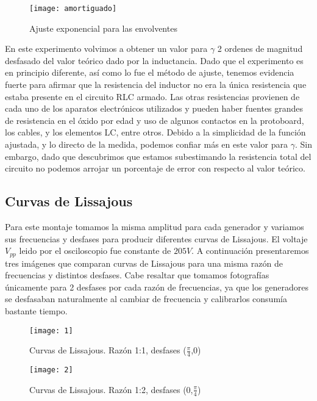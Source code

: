 \documentclass[%
 reprint,
 amsmath,amssymb,
 aps,
]{revtex4-1}
\begin{document}
\begin{figure}[h]
\caption{Ajuste exponencial para las envolventes}
\centering
\texttt{[image: amortiguado]}
\label{fig:amortiguado}
\end{figure}

En este experimento volvimos a obtener un valor para $\gamma$ 2 ordenes de magnitud desfasado del valor te\'orico dado por la inductancia. Dado que el experimento es en principio diferente, as\'i como lo fue el m\'etodo de ajuste, tenemos evidencia fuerte para afirmar que la resistencia del inductor no era la \'unica resistencia que estaba presente en el circuito RLC armado. Las otras resistencias provienen de cada uno de los aparatos electr\'onicos utilizados y pueden haber fuentes grandes de resistencia en el \'oxido por edad y uso de algunos contactos en la protoboard, los cables, y los elementos LC, entre otros. Debido a la simplicidad de la funci\'on ajustada, y lo directo de la medida, podemos confiar m\'as en este valor para $\gamma$. Sin embargo, dado que descubrimos que estamos subestimando la resistencia total del circuito no podemos arrojar un porcentaje de error con respecto al valor te\'orico.

\subsection{\label{sec:level2}Curvas de Lissajous}
Para este montaje tomamos la misma amplitud para cada generador y variamos sus frecuencias y desfases para producir diferentes curvas de Lissajous. El voltaje $V_{pp}$ leido por el osciloscopio fue constante de $205V$. A continuación presentaremos tres imágenes que comparan curvas de Lissajous para una misma razón de frecuencias y distintos desfases. Cabe resaltar que tomamos fotografías únicamente para 2 desfases por cada razón de frecuencias, ya que los generadores se desfasaban naturalmente al cambiar de frecuencia y calibrarlos consumía bastante tiempo.\\

\begin{figure}[h!]
\caption{ Curvas de Lissajous. Razón 1:1, desfases ($\frac{\pi}{4}$,0) }
\centering
\texttt{[image: 1]}
\label{fig:amortiguado}
\end{figure}

\begin{figure}[h!]
\caption{ Curvas de Lissajous. Razón 1:2, desfases (0,$\frac{\pi}{4}$) }
\centering
\texttt{[image: 2]}
\label{fig:amortiguado}
\end{figure}
\end{document}
